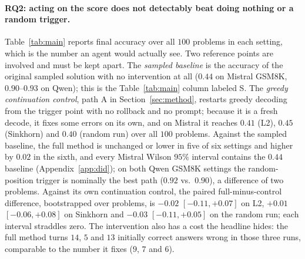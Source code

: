 \documentclass{article}
\begin{document}
\paragraph{RQ2: acting on the score does not detectably beat doing nothing or a random trigger.}
Table~\ref{tab:main} reports final accuracy over all $100$ problems in each setting, which is the number an agent would actually see. Two reference points are involved and must be kept apart. The \emph{sampled baseline} is the accuracy of the original sampled solution with no intervention at all ($0.44$ on Mistral GSM8K, $0.90$--$0.93$ on Qwen); this is the Table~\ref{tab:main} column labeled S. The \emph{greedy continuation control}, path A in Section~\ref{sec:method}, restarts greedy decoding from the trigger point with no rollback and no prompt; because it is a fresh decode, it fixes some errors on its own, and on Mistral it reaches $0.41$ (L2), $0.45$ (Sinkhorn) and $0.40$ (random run) over all $100$ problems. Against the sampled baseline, the full method is unchanged or lower in five of six settings and higher by $0.02$ in the sixth, and every Mistral Wilson $95\%$ interval contains the $0.44$ baseline (Appendix~\ref{app:did}); on both Qwen GSM8K settings the random-position trigger is nominally the best path ($0.92$ vs.\ $0.90$), a difference of two problems. Against its own continuation control, the paired full-minus-control difference, bootstrapped over problems, is $-0.02$ $[-0.11,+0.07]$ on L2, $+0.01$ $[-0.06,+0.08]$ on Sinkhorn and $-0.03$ $[-0.11,+0.05]$ on the random run; each interval straddles zero. The intervention also has a cost the headline hides: the full method turns $14$, $5$ and $13$ initially correct answers wrong in those three runs, comparable to the number it fixes ($9$, $7$ and $6$).
\end{document}
